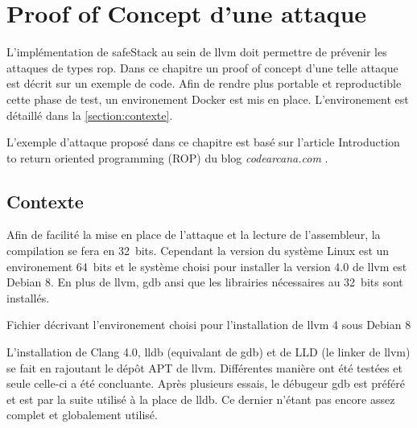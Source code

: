 \chapter{Proof of Concept d'une attaque}
\label{chap:attaque}

L'implémentation de \gls{safeStack} au sein de \gls{llvm} doit permettre de prévenir les attaques de types \gls{rop}. Dans ce chapitre un \og proof of concept \fg d'une telle attaque est décrit sur un exemple de code. Afin de rendre plus portable et reproductible cette phase de test, un environement Docker est mis en place. L'environement est détaillé dans la \autoref{section:contexte}.

L'exemple d'attaque proposé dans ce chapitre est basé sur l'article \og Introduction to return oriented programming (ROP) \fg du blog \textit{codearcana.com} \cite{IntroductionToROP}.

\minitoc

\newpage

\section{Contexte}
\label{section:contexte}

%
%

Afin de facilité la mise en place de l'attaque et la lecture de l'assembleur, la compilation se fera en 32~bits. Cependant la version du système Linux est un environement 64~bits et le système choisi pour installer la version 4.0 de \gls{llvm} est Debian 8. En plus de \gls{llvm}, \gls{gdb} ansi que les librairies nécessaires au 32~bits sont installés.

\begin{listing}
	\caption{Fichier décrivant l'environement choisi pour l'installation de \gls{llvm} 4 sous Debian 8}
	\label{lst:dockerfile}
\end{listing}

L'installation de Clang 4.0, \gls{lldb} (equivalant de \gls{gdb}) et de LLD (le \og linker \fg de \gls{llvm}) se fait en rajoutant le dépôt APT de \gls{llvm}. Différentes manière ont été testées et seule celle-ci a été concluante. Après plusieurs essais, le débugeur \gls{gdb} est préféré et est par la suite utilisé à la place de \gls{lldb}. Ce dernier n'étant pas encore assez complet et globalement utilisé.




